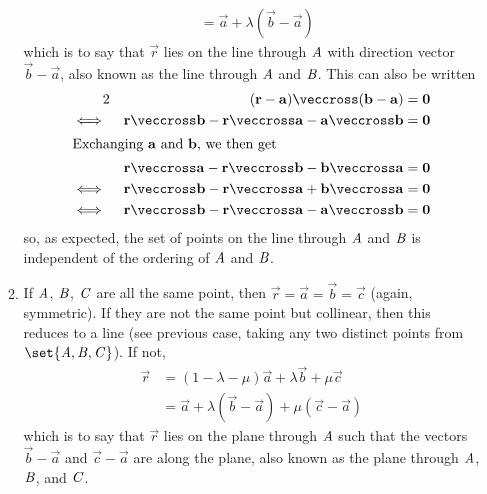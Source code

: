 \documentclass[fleqn,a4paper,11pt]{article}
\begin{document}
\begin{enumerate}
\begin{enumerate}
\begin{align*}
              &= \vec a + \lambda(\vec b - \vec a)
      \end{align*}
      which is to say that \(\vec r\) lies on the line through \(\mathit{A}\) with
      direction vector \(\vec b - \vec a\), also known as the line through
      \(\mathit{A}\) and \(\mathit{B}\). This can also be written
      \begin{alignat*}2
       && (\vec r - \vec a) \veccross (\vec b - \vec a) &= \vec 0 \\
       \iff{}&& \vec r \veccross \vec b - \vec r \veccross \vec a
                - \vec a \veccross \vec b &= \vec 0 \\
      \intertext{Exchanging \(\vec a\) and \(\vec b\), we then get}
       && \vec r \veccross \vec a - \vec r \veccross \vec b
                - \vec b \veccross \vec a &= \vec 0 \\
       \iff{}&& \vec r \veccross \vec b - \vec r \veccross \vec a
                + \vec b \veccross \vec a &= \vec 0 \\
       \iff{}&& \vec r \veccross \vec b - \vec r \veccross \vec a
                - \vec a \veccross \vec b &= \vec 0
      \end{alignat*}
      so, as expected, the set of points on the line through \(\mathit{A}\) and
      \(\mathit{B}\) is independent of the ordering of \(\mathit{A}\) and \(\mathit{B}\).
     \item
      If \(\mathit{A}\), \(\mathit{B}\), \(\mathit{C}\) are all the same point, then
      \(\vec r = \vec a = \vec b = \vec c\) (again, symmetric). If they are not
      the same point but collinear, then this reduces to a line (see previous
      case, taking any two distinct points
      from \(\set{\pnt A, \pnt B, \pnt C}\)). If not,
      \begin{align*}
       \vec r &= (1 - \lambda - \mu)\vec a + \lambda \vec b + \mu \vec c \\
              &= \vec a + \lambda(\vec b - \vec a) + \mu (\vec c - \vec a)
      \end{align*}
      which is to say that \(\vec r\) lies on the plane through \(\mathit{A}\) such
      that the vectors \(\vec b - \vec a\) and \(\vec c - \vec a\) are along the
      plane, also known as the plane through \(\mathit{A}\), \(\mathit{B}\), and
      \(\mathit{C}\).


\end{enumerate}
\end{enumerate}
\end{document}
